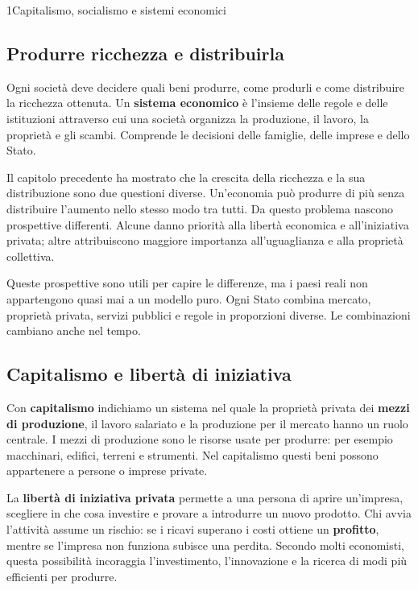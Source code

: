 \begin{lettura}{1}{Capitalismo, socialismo e sistemi economici}

\subsection*{Produrre ricchezza e distribuirla}
Ogni società deve decidere quali beni produrre, come produrli e come distribuire la ricchezza ottenuta. Un \textbf{sistema economico} è l'insieme delle regole e delle istituzioni attraverso cui una società organizza la produzione, il lavoro, la proprietà e gli scambi. Comprende le decisioni delle famiglie, delle imprese e dello Stato.

Il capitolo precedente ha mostrato che la crescita della ricchezza e la sua distribuzione sono due questioni diverse. Un'economia può produrre di più senza distribuire l'aumento nello stesso modo tra tutti. Da questo problema nascono prospettive differenti. Alcune danno priorità alla libertà economica e all'iniziativa privata; altre attribuiscono maggiore importanza all'uguaglianza e alla proprietà collettiva.

Queste prospettive sono utili per capire le differenze, ma i paesi reali non appartengono quasi mai a un modello puro. Ogni Stato combina mercato, proprietà privata, servizi pubblici e regole in proporzioni diverse. Le combinazioni cambiano anche nel tempo.

\subsection*{Capitalismo e libertà di iniziativa}
Con \textbf{capitalismo} indichiamo un sistema nel quale la proprietà privata dei \textbf{mezzi di produzione}, il lavoro salariato e la produzione per il mercato hanno un ruolo centrale. I mezzi di produzione sono le risorse usate per produrre: per esempio macchinari, edifici, terreni e strumenti. Nel capitalismo questi beni possono appartenere a persone o imprese private.

La \textbf{libertà di iniziativa privata} permette a una persona di aprire un'impresa, scegliere in che cosa investire e provare a introdurre un nuovo prodotto. Chi avvia l'attività assume un rischio: se i ricavi superano i costi ottiene un \textbf{profitto}, mentre se l'impresa non funziona subisce una perdita. Secondo molti economisti, questa possibilità incoraggia l'investimento, l'innovazione e la ricerca di modi più efficienti per produrre.


\end{lettura}
